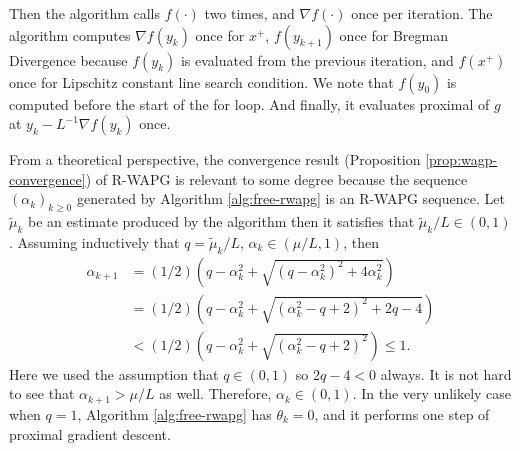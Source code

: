 \documentclass[12pt]{article}
\begin{document}
    Then the algorithm calls $f(\cdot)$ two times, and $\nabla f(\cdot)$ once per iteration. 
    The algorithm computes $\nabla f(y_k)$ once for $x^+$, $f(y_{k + 1})$ once for Bregman Divergence because $f(y_{k})$ is evaluated from the previous iteration, and $f(x^+)$ once for Lipschitz constant line search condition. 
    We note that $f(y_0)$ is computed before the start of the for loop. 
    And finally, it evaluates proximal of $g$ at $y_k - L^{-1}\nabla f(y_k)$ once. 
    \par 
    From a theoretical perspective, the convergence result (Proposition \ref{prop:wagp-convergence}) of R-WAPG is relevant to some degree because the sequence $(\alpha_k)_{k \ge 0}$ generated by Algorithm \ref{alg:free-rwapg} is an R-WAPG sequence. 
    Let $\tilde \mu_k$ be an estimate produced by the algorithm then it satisfies that $\tilde \mu_k/ L \in (0, 1)$.
    Assuming inductively that $q = \tilde \mu_k/L$,  $\alpha_k \in (\mu/L, 1)$, then 
    \begin{align*}
        \alpha_{k + 1} 
        &= 
        (1/2)\left(
            q - \alpha_k^2 + \sqrt{(q - \alpha_k^2)^2 + 4 \alpha_k^2}
        \right)
        \\
        &= 
        (1/2)\left(
            q - \alpha_k^2 + \sqrt{
                (\alpha_k^2 - q + 2)^2 + 2q - 4
            }
        \right)
        \\
        &< 
        (1/2)\left(
            q - \alpha_k^2 + \sqrt{
                (\alpha_k^2 - q + 2)^2
            }
        \right) \le 1. 
    \end{align*}
    Here we used the assumption that $q \in (0, 1)$ so $2q - 4 < 0$ always. 
    It is not hard to see that $\alpha_{k + 1} > \mu/L$ as well. 
    Therefore, $\alpha_k \in (0, 1)$. 
    In the very unlikely case when $q = 1$, Algorithm \ref{alg:free-rwapg} has $\theta_k = 0$, and it performs one step of proximal gradient descent. 
\end{document}
